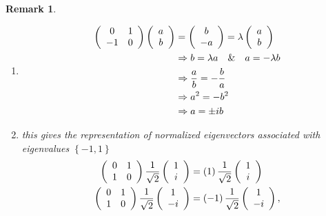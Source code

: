 \documentclass[aps,preprint]{revtex4}%
\newtheorem{remark}[theorem]{Remark}
\begin{document}
\begin{remark}
\begin{enumerate}
\item
\begin{align}
\left(
\begin{array}
[c]{cc}%
0 & 1\\
-1 & 0
\end{array}
\right)  \left(
\begin{array}
[c]{c}%
a\\
b
\end{array}
\right)   &  =\left(
\begin{array}
[c]{c}%
b\\
-a
\end{array}
\right)  =\lambda\left(
\begin{array}
[c]{c}%
a\\
b
\end{array}
\right) \\
&  \Rightarrow b=\lambda a\quad\&\quad a=-\lambda b\\
&  \Rightarrow\frac{a}{b}=-\frac{b}{a}\\
&  \Rightarrow a^{2}=-b^{2}\\
&  \Rightarrow a=\pm ib
\end{align}


\item this gives the representation of normalized eigenvectors associated with
eigenvalues $\left\{  -1,1\right\}  $%
\begin{align}
\left(
\begin{array}
[c]{cc}%
0 & 1\\
1 & 0
\end{array}
\right)  \frac{1}{\sqrt{2}}\left(
\begin{array}
[c]{c}%
1\\
i
\end{array}
\right)   &  =\left(  1\right)  \frac{1}{\sqrt{2}}\left(
\begin{array}
[c]{c}%
1\\
i
\end{array}
\right) \\
\left(
\begin{array}
[c]{cc}%
0 & 1\\
1 & 0
\end{array}
\right)  \frac{1}{\sqrt{2}}\left(
\begin{array}
[c]{c}%
1\\
-i
\end{array}
\right)   &  =\left(  -1\right)  \frac{1}{\sqrt{2}}\left(
\begin{array}
[c]{c}%
1\\
-i
\end{array}
\right)  ,
\end{align}



\end{enumerate}
\end{remark}
\end{document}
